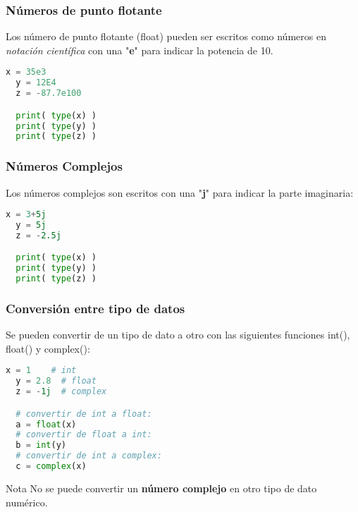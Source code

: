 \begin{frame}[fragile]
  \frametitle{Números de punto flotante}

  Los número de punto flotante (\textcolor{codeKeyword2}{float}) pueden ser
  escritos como números en \emph{notación científica} con una "\textbf{e}"
  para indicar la potencia de 10.

  \vspace{\baselineskip}
  \begin{lstlisting}[language=Python]
  x = 35e3
  y = 12E4
  z = -87.7e100

  print( type(x) )
  print( type(y) )
  print( type(z) )
  \end{lstlisting}
\end{frame}

\begin{frame}[fragile]
  \frametitle{Números Complejos}

  Los números complejos son escritos con una "\textbf{j}" para indicar
  la parte imaginaria:

  \vspace{\baselineskip}
  \begin{lstlisting}[language=Python]
  x = 3+5j
  y = 5j
  z = -2.5j

  print( type(x) )
  print( type(y) )
  print( type(z) )
  \end{lstlisting}
\end{frame}

\begin{frame}[fragile]
  \frametitle{Conversión entre tipo de datos}

  \vspace{\baselineskip}
  Se pueden convertir de un tipo de dato a otro con las siguientes
  funciones \textcolor{codeKeyword2}{int}(), \textcolor{codeKeyword2}{float}()
  y \textcolor{codeKeyword2}{complex}():

  \begin{lstlisting}[language=Python]
  x = 1    # int
  y = 2.8  # float
  z = -1j  # complex

  # convertir de int a float:
  a = float(x)
  # convertir de float a int:
  b = int(y)
  # convertir de int a complex:
  c = complex(x)
  \end{lstlisting}

  \pausa
  \begin{alertblock}{Nota}
    No se puede convertir un \textbf{número complejo} en otro tipo de dato numérico.
  \end{alertblock}
\end{frame}

